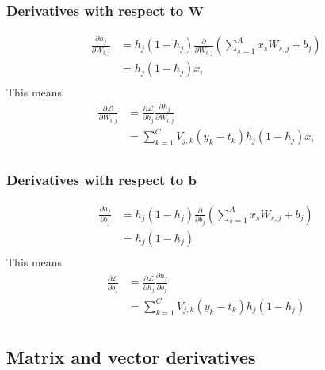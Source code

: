 \documentclass{article}
\begin{document}
\subsubsection*{Derivatives with respect to $\mathbf{W}$}
\begin{equation}
\begin{split}
    \frac{\partial h_j}{\partial W_{i,j}}
    &= h_j (1 - h_j) \frac{\partial}{\partial W_{i,j}}
       \left(\sum_{s=1}^A x_s W_{s,j} + b_j \right)\\
    &= h_j (1 - h_j) x_i \\
\end{split}
\end{equation}
This means
\begin{equation}
\begin{split}
    \frac{\partial \mathcal{L}}{\partial W_{i,j}}
    &= \frac{\partial \mathcal{L}}{\partial h_j}
       \frac{\partial h_j}{\partial W_{i,j}} \\
    &= \sum_{k=1}^C V_{j,k}(y_k - t_k) h_j (1 - h_j) x_i \\
\end{split}
\end{equation}

\subsubsection*{Derivatives with respect to $\mathbf{b}$}
\begin{equation}
\begin{split}
    \frac{\partial h_j}{\partial b_j}
    &= h_j (1 - h_j) \frac{\partial}{\partial b_j}
       \left(\sum_{s=1}^A x_s W_{s,j} + b_j \right)\\
    &= h_j (1 - h_j) \\
\end{split}
\end{equation}
This means
\begin{equation}
\begin{split}
    \frac{\partial \mathcal{L}}{\partial b_j}
    &= \frac{\partial \mathcal{L}}{\partial h_j}
       \frac{\partial h_j}{\partial b_j} \\
    &= \sum_{k=1}^C V_{j,k}(y_k - t_k) h_j (1 - h_j) \\
\end{split}
\end{equation}

\subsection*{Matrix and vector derivatives}
\end{document}
